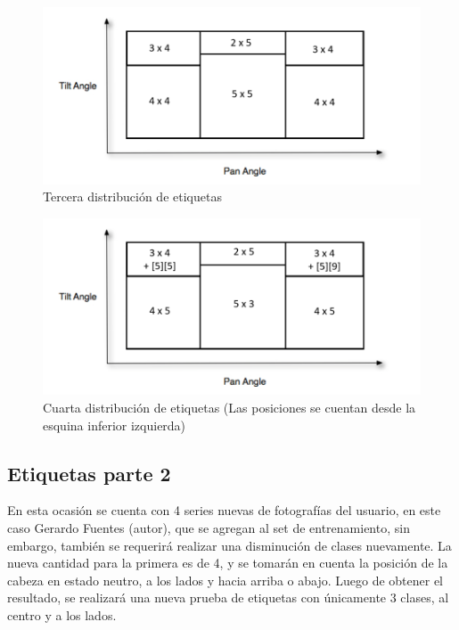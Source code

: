 \begin{figure}[H]
	\centering
	\includegraphics[scale=1]{figures/clasi2.png}
	\caption{Tercera distribución de etiquetas}
	\label{fig:img7}
\end{figure}

\begin{figure}[H]
	\centering
	\includegraphics[scale=1]{figures/clasi3.png}
	\caption{Cuarta distribución de etiquetas (Las posiciones se cuentan desde la esquina inferior izquierda)}
	\label{fig:img8}
\end{figure}

\subsection{Etiquetas parte 2}
En esta ocasión se cuenta con 4 series nuevas de fotografías del usuario, en este caso Gerardo Fuentes (autor), que se agregan al set de entrenamiento, sin embargo, también se requerirá realizar una disminución de clases nuevamente. La nueva cantidad para la primera es de 4, y se tomarán en cuenta la posición de la cabeza en estado neutro, a los lados y hacia arriba o abajo. Luego de obtener el resultado, se realizará una nueva prueba de etiquetas con únicamente 3 clases, al centro y a los lados. 


